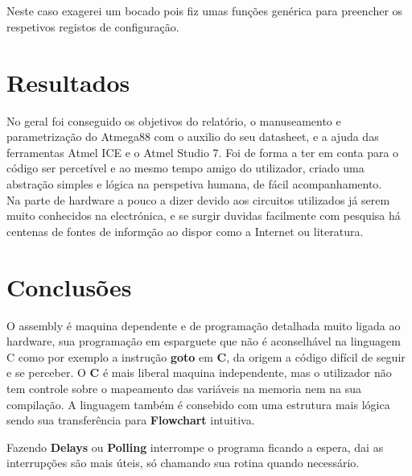 \documentclass[titlepage, a4paper, 10pt, reqno, openany]{report}
\begin{document}
\\
\\
\\
\\
Neste caso exagerei um bocado pois fiz umas funções genérica para preencher os respetivos registos de configuração.
\section{Resultados}
No geral foi conseguido os objetivos do relat\'{o}rio, o manuseamento e parametriza\c{c}\~{a}o do Atmega88 com o auxilio do seu datasheet, e a ajuda das ferramentas Atmel ICE e o Atmel Studio 7.
Foi de forma a ter em conta para o c\'{o}digo ser percet\'{i}vel e ao mesmo tempo amigo do utilizador, criado uma abstra\c{c}\~{a}o simples e l\'{o}gica na perspetiva humana, de fácil acompanhamento. \\
Na parte de hardware a pouco a dizer devido aos circuitos utilizados j\'{a} serem muito conhecidos na electr\'{o}nica, e se surgir duvidas facilmente com pesquisa h\'{a} centenas de fontes de inform\c{c}\~{a}o ao dispor como a Internet ou literatura.
\section{Conclus\~{o}es}
O assembly \'{e} maquina dependente e de programa\c{c}\~{a}o detalhada muito ligada ao hardware, sua programa\c{c}\~{a}o em esparguete que n\~{a}o \'{e} aconselh\'{a}vel na linguagem C como por exemplo a instru\c{c}\~{a}o {\bf goto} em {\bf C}, da origem a c\'{o}digo dif\'{i}cil de seguir e se perceber.
O {\bf C} \'{e} mais liberal maquina independente, mas o utilizador n\~{a}o tem controle sobre o mapeamento das vari\'{a}veis na memoria nem na sua compila\c{c}\~{a}o. A linguagem tamb\'{e}m \'{e} consebido com uma estrutura mais l\'{o}gica sendo sua transfer\^{e}ncia para {\bf Flowchart} intuitiva. \par
Fazendo {\bf Delays} ou {\bf Polling} interrompe o programa ficando a espera, dai as interrup\c{c}\~{o}es s\~{a}o mais \'{u}teis, s\'{o} chamando sua rotina quando necess\'{a}rio. \\
	
\end{document}
